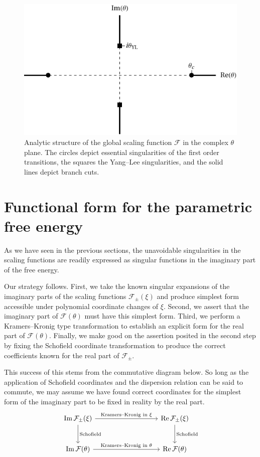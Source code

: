 \documentclass[
  aps,
  pre,
  preprint,
  longbibliography,
  floatfix
]{revtex4-2}
\begin{document}
\begin{figure}
  \includegraphics{figs/F_theta_singularities.pdf}
  \caption{
    Analytic structure of the global scaling function $\mathcal F$ in the
    complex $\theta$ plane. The circles depict essential singularities of the
    first order transitions, the squares the Yang--Lee singularities, and the
    solid lines depict branch cuts.
  } \label{fig:schofield.singularities}
\end{figure}

\section{Functional form for the parametric free energy}

As we have seen in the previous sections, the unavoidable singularities in the
scaling functions are readily expressed as singular functions in the imaginary
part of the free energy.

Our strategy follows. First, we take the known singular expansions of the imaginary parts of the scaling functions $\mathcal F_{\pm}(\xi)$ and produce simplest form accessible under polynomial coordinate changes of $\xi$. Second, we assert that the imaginary part of $\mathcal F(\theta)$ must have this simplest form. Third, we perform a Kramers--Kronig type transformation to establish an explicit form for the real part of $\mathcal F(\theta)$. Finally, we make good on the assertion posited in the second step by fixing the Schofield coordinate transformation to produce the correct coefficients known for the real part of $\mathcal F_{\pm}$.

This success of this stems from the commutative diagram below. So long as the
application of Schofield coordinates and the dispersion relation can be said to
commute, we may assume we have found correct coordinates for the simplest form
of the imaginary part to be fixed in reality by the real part.
\[
  \begin{tikzcd}[row sep=large, column sep = 9em]
  \operatorname{Im}\mathcal F_\pm(\xi) \arrow{r}{\text{Kramers--Kronig in $\xi$}} \arrow[]{d}{\text{Schofield}} & \operatorname{Re}\mathcal F_{\pm}(\xi) \arrow{d}{\text{Schofield}} \\%
  \operatorname{Im}\mathcal F(\theta) \arrow{r}{\text{Kramers--Kronig in $\theta$}}& \operatorname{Re}\mathcal F(\theta)
\end{tikzcd}
\]
\end{document}
